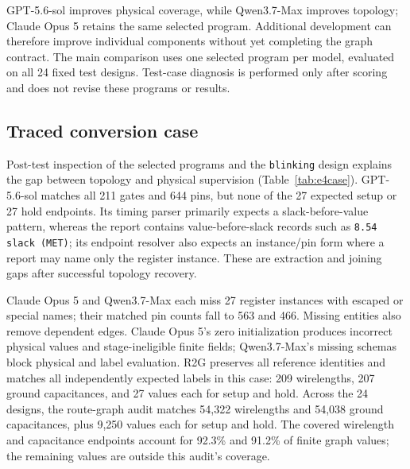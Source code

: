 \begin{table}[htbp]\centering
\caption{Selected development-program metrics before and after the uniform budget extension. Each arrow denotes 400k $\rightarrow$ 600k ceilings; actual ledger usage can be below the ceiling.}
\setlength{\tabcolsep}{3pt}

\end{table}

GPT-5.6-sol improves physical coverage, while Qwen3.7-Max improves topology; Claude Opus 5 retains the same selected program. Additional development can therefore improve individual components without yet completing the graph contract. The main comparison uses one selected program per model, evaluated on all 24 fixed test designs. Test-case diagnosis is performed only after scoring and does not revise these programs or results.

\subsection{Traced conversion case}
Post-test inspection of the selected programs and the \texttt{blinking} design explains the gap between topology and physical supervision (Table~\ref{tab:e4case}). GPT-5.6-sol matches all 211 gates and 644 pins, but none of the 27 expected setup or 27 hold endpoints. Its timing parser primarily expects a slack-before-value pattern, whereas the report contains value-before-slack records such as \texttt{8.54 slack (MET)}; its endpoint resolver also expects an instance/pin form where a report may name only the register instance. These are extraction and joining gaps after successful topology recovery.

\begin{table}[htbp]
\centering
\caption{Representative \texttt{blinking} route-graph audit. Gates/pins show matched identities over expected identities. Label columns show matched values within tolerance over independently expected endpoints. U means unassessable.}
\label{tab:e4case}
\setlength{\tabcolsep}{3pt}

\end{table}

Claude Opus 5 and Qwen3.7-Max each miss 27 register instances with escaped or special names; their matched pin counts fall to 563 and 466. Missing entities also remove dependent edges. Claude Opus 5's zero initialization produces incorrect physical values and stage-ineligible finite fields; Qwen3.7-Max's missing schemas block physical and label evaluation. R2G preserves all reference identities and matches all independently expected labels in this case: 209 wirelengths, 207 ground capacitances, and 27 values each for setup and hold. Across the 24 designs, the route-graph audit matches 54,322 wirelengths and 54,038 ground capacitances, plus 9,250 values each for setup and hold. The covered wirelength and capacitance endpoints account for 92.3\% and 91.2\% of finite graph values; the remaining values are outside this audit's coverage.
